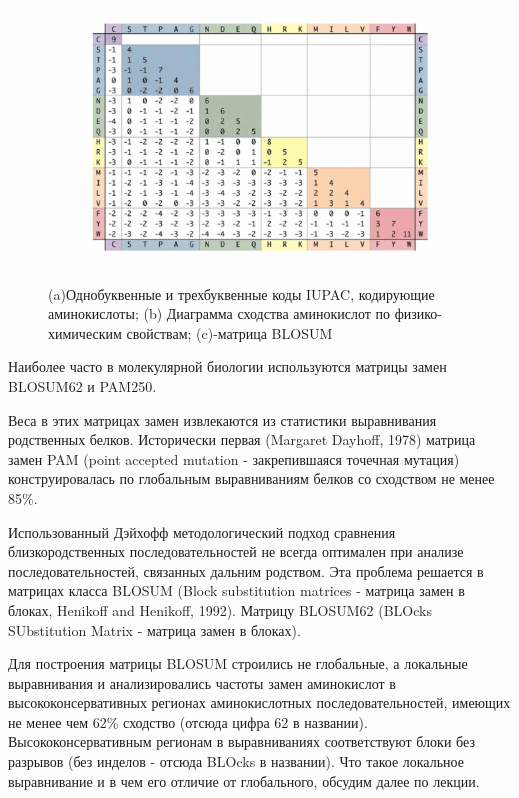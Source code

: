 \documentclass[letterpaper, 11pt]{article}
\begin{document}
\begin{figure}
\begin{subfigure}{.6\textwidth}
  \caption{}
  \label{fig:sub2}
\end{subfigure}
\begin{subfigure}{.9\textwidth}
  \centering
  \includegraphics[width=1.2\linewidth]{images/BLOSUM.png}
  \caption{}
  \label{fig:sub2}
\end{subfigure}
\caption{(a)Однобуквенные и трехбуквенные коды IUPAC, кодирующие аминокислоты; (b) Диаграмма сходства аминокислот по физико-химическим свойствам; (c)-матрица BLOSUM}
\label{fig:test}
\end{figure}

Наиболее часто в молекулярной биологии используются матрицы замен BLOSUM62 и PAM250.

Веса в этих матрицах замен извлекаются из статистики выравнивания родственных белков. Исторически первая (Margaret Dayhoff, 1978) матрица замен PAM  (point accepted mutation - закрепившаяся точечная мутация) конструировалась по глобальным выравниваниям белков со сходством не менее 85\%.

Использованный Дэйхофф методологический подход сравнения близкородственных последовательностей не всегда оптимален при анализе последовательностей, связанных дальним родством. Эта проблема решается в матрицах класса BLOSUM (Block substitution matrices - матрица замен в блоках, Henikoff and Henikoff, 1992). Матрицу BLOSUM62 (BLOcks SUbstitution Matrix - матрица замен в блоках).

Для построения матрицы BLOSUM строились не глобальные, а локальные выравнивания и анализировались частоты замен аминокислот в высококонсервативных регионах аминокислотных последовательностей, имеющих не менее чем 62\% сходство (отсюда цифра 62 в названии). Высококонсервативным регионам в выравниваниях соответствуют блоки без разрывов (без инделов - отсюда BLOcks в названии). Что такое локальное выравнивание и в чем его отличие от глобального, обсудим далее по лекции.
\end{document}
